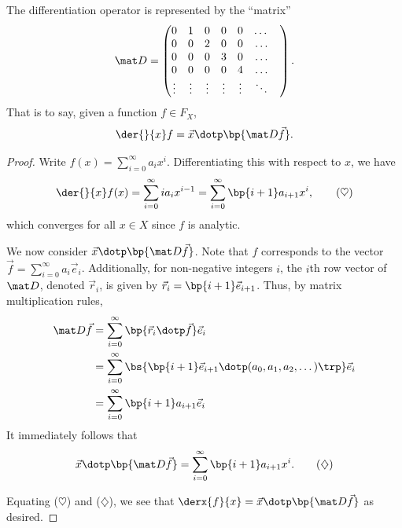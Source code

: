 \begin{proposition}\label{prop:diff-matr}
    The differentiation operator is represented by the ``matrix'' \[\mat D = \begin{pmatrix}0 & 1 & 0 & 0 & 0 & \dots & \\ 0 & 0 & 2 & 0 & 0 & \dots \\ 0 & 0 & 0 & 3 & 0 & \dots \\ 0 & 0 & 0 & 0 & 4 & \dots \\ \vdots & \vdots & \vdots & \vdots & \vdots & \ddots \end{pmatrix}.\] That is to say, given a function $f \in F_X$, \[\der{}{x} f = \vec x \dotp \bp{\mat D \vec f}.\]
\end{proposition}
\begin{proof}
    Write $f(x) = \sum_{i = 0}^\infty a_i x^i$. Differentiating this with respect to $x$, we have \[\der{}{x} f(x) = \sum_{i = 0}^\infty i a_i x^{i-1} = \sum_{i = 0}^\infty \bp{i+1} a_{i+1} x^i,\tag{$\heartsuit$}\] which converges for all $x \in X$ since $f$ is analytic.

    We now consider $\vec x \dotp \bp{\mat D \vec f}$. Note that $f$ corresponds to the vector $\vec f = \sum_{i = 0}^\infty a_i \vec e_i$. Additionally, for non-negative integers $i$, the $i$th row vector of $\mat D$, denoted $\vec r_i$, is given by $\vec r_i = \bp{i+1} \vec e_{i+1}$. Thus, by matrix multiplication rules,
    \begin{align*}
        \mat D \vec f &= \sum_{i = 0}^\infty \bp{\vec r_i \dotp \vec f} \vec e_i\\
        &= \sum_{i = 0}^\infty \bs{\bp{i+1} \vec e_{i+1} \dotp (a_0, a_1, a_2, \dots)\trp} \vec e_i\\
        &= \sum_{i = 0}^\infty \bp{i+1} a_{i+1} \vec e_{i}
    \end{align*}
    It immediately follows that \[\vec x \dotp \bp{\mat D \vec f} = \sum_{i = 0}^\infty \bp{i + 1} a_{i+1} x^i. \tag{$\diamondsuit$}\]

    Equating ($\heartsuit$) and ($\diamondsuit$), we see that $\derx{f}{x} = \vec x \dotp \bp{\mat D \vec f}$ as desired.
\end{proof}

